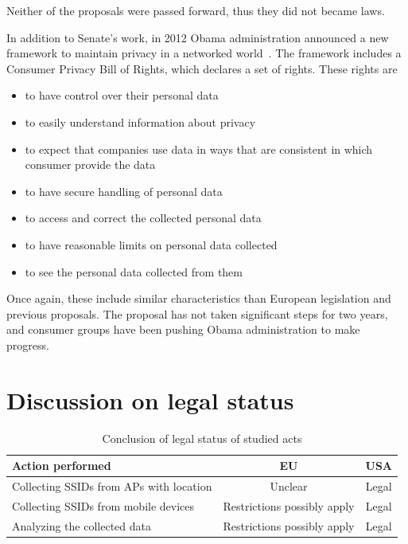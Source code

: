 \documentclass[12pt,a4paper,oneside,pdftex]{report}
\begin{document}
Neither of the proposals were passed forward, thus they did not became laws.

In addition to Senate's work, in 2012 Obama administration announced a new framework to maintain privacy in a networked world~\cite{con_pbr}. The framework includes a Consumer Privacy Bill of Rights, which declares a set of rights. These rights are

\begin{itemize}
    \item to have control over their personal data
    \item to easily understand information about privacy
    \item to expect that companies use data in ways that are consistent in which consumer provide the data
    \item to have secure handling of personal data
    \item to access and correct the collected personal data
    \item to have reasonable limits on personal data collected
    \item to see the personal data collected from them
\end{itemize}

Once again, these include similar characteristics than European legislation and previous proposals. The proposal has not taken significant steps for two years, and consumer groups have been pushing Obama administration to make progress.~\cite{law360_groups}

\section{Discussion on legal status}

\begin{table}[h]
\center
    \begin{tabular}{|l|c|c|}
        \hline
        \textbf{Action performed} & \textbf{EU} & \textbf{USA} \\ \hline
        Collecting SSIDs from APs with location & Unclear & Legal \\ 
        \hline
        Collecting SSIDs from mobile devices & Restrictions possibly apply & Legal \\ 
        \hline
        Analyzing the collected data & Restrictions possibly apply & Legal \\ \hline
    \end{tabular}
    \caption{Conclusion of legal status of studied acts}
    \label{table:conclusion}
\end{table}
\end{document}
